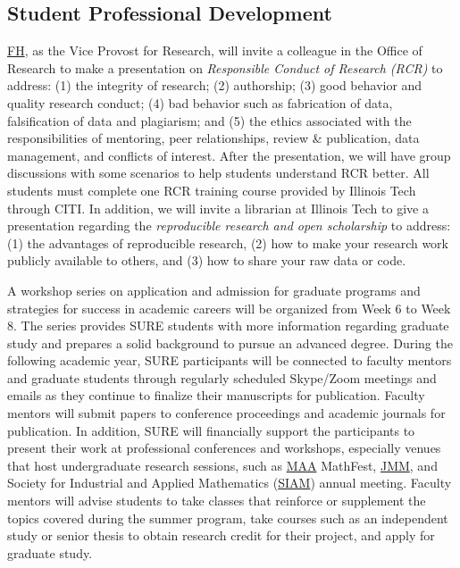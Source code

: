 \documentclass[11pt]{NSFamsart}
\newcommand{\FH}{\hyperlink{FHlink}{FH}\xspace}
\newcommand{\MAA}{\hyperlink{MAAlink}{MAA}\xspace}
\newcommand{\JMM}{\hyperlink{JMMlink}{JMM}\xspace}
\newcommand{\SIAM}{\hyperlink{SIAMlink}{SIAM}\xspace}
\begin{document}
\subsection{Student Professional Development}
\FH, as the Vice Provost for Research, will invite a colleague in the  Office of Research to make a presentation on \emph{Responsible Conduct of Research (RCR)} to address: (1) the integrity of research; (2) authorship;  (3) good behavior
and quality research conduct; (4) bad behavior such as fabrication of data, falsification of data and
plagiarism; and (5) the ethics associated with the responsibilities of mentoring, peer relationships, review \& publication, data management, and conflicts of interest. After the presentation, we will have group discussions with some scenarios to help students understand RCR better.
All students must complete one RCR training course provided by Illinois Tech through CITI.  In addition, we will invite a librarian at Illinois Tech to give a presentation regarding the \emph{reproducible research and open scholarship} to address: (1) the advantages of  reproducible research, (2) how to make your research work publicly available to others, and
(3) how to share your raw data or code.

A workshop series on application and admission for graduate programs and strategies for success in academic careers will be organized from Week 6 to Week 8. The series provides SURE students with more information regarding graduate study and prepares a solid background to pursue an advanced degree.  During the following academic year, SURE participants will be connected to faculty mentors and graduate students through regularly scheduled Skype/Zoom meetings and emails as they continue to finalize their manuscripts for publication. Faculty mentors will submit papers to conference proceedings and academic journals for publication. In addition, SURE will financially support the participants to present their work at professional conferences and workshops, especially venues that host undergraduate research sessions, such as \MAA MathFest, \JMM, and \hypertarget{SIAMlink}{Society for Industrial and Applied Mathematics} (\SIAM) annual meeting. Faculty mentors will advise students to take classes that reinforce or supplement the topics covered during the summer program, take courses such as an independent study or senior thesis to obtain research credit for their project, and apply for graduate study.
\end{document}
